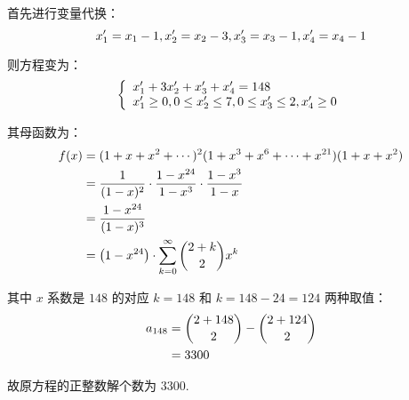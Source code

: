 \documentclass[cn, hazy, blue, normal, 12pt]{elegantnote}
\begin{document}
\begin{solution}[print=true]

    首先进行变量代换：
    \begin{equation}
        \notag
        x_1^{\prime} = x_1-1,
        x_2^{\prime} = x_2-3,
        x_3^{\prime} = x_3-1,
        x_4^{\prime} = x_4-1
    \end{equation}

    则方程变为：
    \begin{equation}
        \notag
        \left\{
        \begin{array}{l}
            x_1^{\prime} + 3 x_2^{\prime} + x_3^{\prime} + x_4^{\prime} = 148 \\
            x_1^{\prime} \geq 0,
            0 \leq x_2^{\prime} \leq 7,
            0 \leq x_3^{\prime} \leq 2,
            x_4^{\prime} \geq 0
        \end{array}
        \right.
    \end{equation}

    其母函数为：
    \begin{equation}
        \notag
        \begin{aligned}
            f(x) & = (1+x+x^2+\cdots)^2
            (1+x^3+x^6+\cdots+x^{21})
            (1+x+x^2)                            \\
                 & = \dfrac{1}{(1-x)^2} \cdot
            \dfrac{1-x^{24}}{1-x^3} \cdot
            \dfrac{1-x^3}{1-x}                   \\
                 & = \dfrac{1-x^{24}}{(1-x)^3}   \\
                 & = \left(1-x^{24}\right) \cdot
            \sum_{k=0}^{\infty} {
            \dbinom{2+k}{2}
            x^k}
        \end{aligned}
    \end{equation}

    其中 $x$ 系数是 $148$ 的对应 $k=148$ 和 $k=148-24=124$ 两种取值：
    \begin{equation}
        \notag
        \begin{aligned}
            a_{148}
             & = \dbinom{2+148}{2} -
            \dbinom{2+124}{2}        \\
             & = 3300
        \end{aligned}
    \end{equation}

    故原方程的正整数解个数为 $3300$.

\end{solution}
\end{document}
